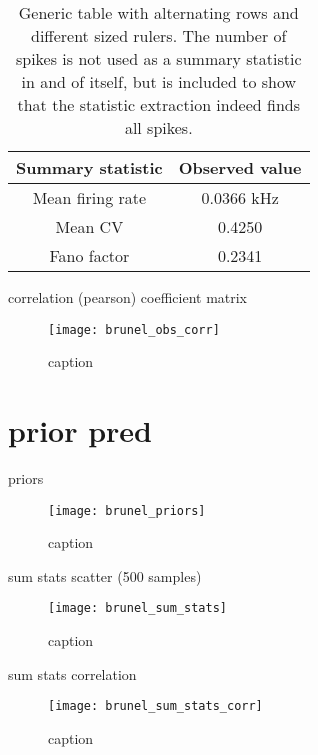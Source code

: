 \begin{table}[H]
  \caption{Generic table with alternating rows and different sized rulers. The number of spikes is not used as a summary statistic in and of itself, but is included to show that the statistic extraction indeed finds all spikes.}
  \begin{center}
    \begin{tabular}{cc}
      \toprule
      \textbf{Summary statistic} & \textbf{Observed value} \\
      \midrule
      Mean firing rate &  0.0366 kHz \\
      Mean CV &  0.4250  \\
      Fano factor & 0.2341  \\
      \bottomrule
    \end{tabular}
  \end{center}
  \label{tab:hh_noisy_sumstats}
\end{table}

correlation (pearson) coefficient matrix

\begin{figure}[H]
    \centering
    \texttt{[image: brunel\_obs\_corr]}
    \caption{caption}
    \label{fig:fig1}
\end{figure}

\section{prior pred}

priors

\begin{figure}[H]
    \centering
    \texttt{[image: brunel\_priors]}
    \caption{caption}
    \label{fig:fig1}
\end{figure}

sum stats scatter (500 samples)

\begin{figure}[H]
    \centering
    \texttt{[image: brunel\_sum\_stats]}
    \caption{caption}
    \label{fig:fig1}
\end{figure}

sum stats correlation

\begin{figure}[H]
    \centering
    \texttt{[image: brunel\_sum\_stats\_corr]}
    \caption{caption}
    \label{fig:fig1}
\end{figure}

